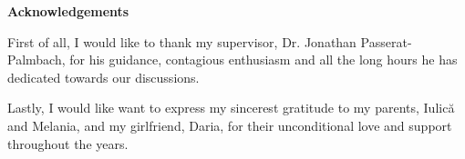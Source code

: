 \thispagestyle{empty}

\begin{center}
\vspace*{4cm}
\textbf{Acknowledgements}
\end{center}

\vspace*{0.3cm}
\begin{spacing}{1.0}
First of all, I would like to thank my supervisor, Dr. Jonathan Passerat-Palmbach, for his guidance, contagious enthusiasm and all the long hours he has dedicated towards our discussions.

Lastly, I would like want to express my sincerest gratitude to my parents, Iulic\u{a} and Melania, and my girlfriend, Daria, for their unconditional love and support throughout the years.
\end{spacing}

\newpage
\blankpage